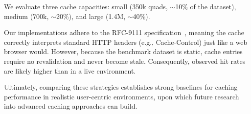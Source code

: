 We evaluate three cache capacities: small (350k quads, $\sim$10\% of the dataset), 
medium (700k, $\sim$20\%), and large (1.4M, $\sim$40\%). 

Our implementations adhere to the RFC-9111 specification~\cite{fielding2022rfc}, 
meaning the cache correctly interprets standard HTTP headers (e.g., Cache-Control) 
just like a web browser would. 
However, because the benchmark dataset is static, cache entries require no revalidation and never become stale. 
Consequently, observed hit rates are likely higher than in a live environment. 

Ultimately, comparing these strategies establishes strong baselines 
for caching performance in realistic user-centric environments, 
upon which future research into advanced caching approaches can build.